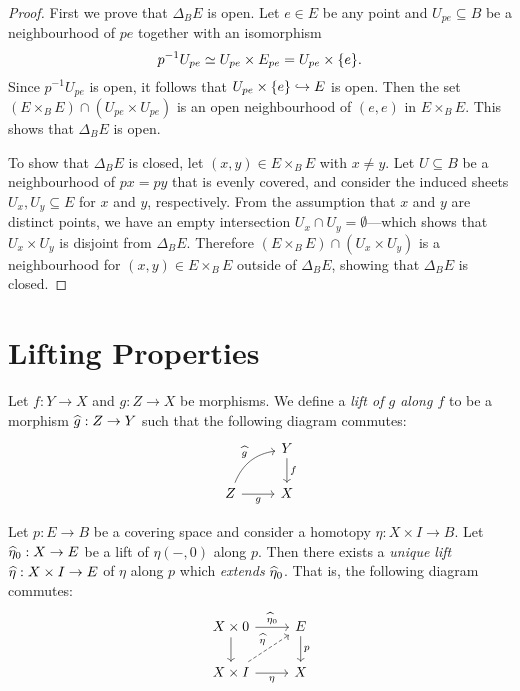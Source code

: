 \begin{proof}
First we prove that \(\Delta_B E\) is open. Let \(e \in E\) be any point and
\(U_{p e} \subseteq B\) be a neighbourhood of \(p e\) together with an
isomorphism
\[
p^{-1} U_{p e} \simeq U_{p e} \times E_{p e} = U_{p e} \times \{e\}.
\]
Since \(p^{-1} U_{p e}\) is open, it follows that
\(U_{p e} \times \{e\} \hookrightarrow E\) is open. Then the set
\((E \times_B E) \cap (U_{p e} \times U_{p e})\) is an open neighbourhood of
\((e, e)\) in \(E \times_B E\). This shows that \(\Delta_B E\) is open.

To show that \(\Delta_B E\) is closed, let \((x, y) \in E \times_B E\) with
\(x \neq y\). Let \(U \subseteq B\) be a neighbourhood of \(p x = p y\) that is
evenly covered, and consider the induced sheets \(U_x, U_y \subseteq E\) for
\(x\) and \(y\), respectively. From the assumption that \(x\) and \(y\) are
distinct points, we have an empty intersection
\(U_x \cap U_y = \emptyset\)---which shows that \(U_x \times U_y\) is disjoint
from \(\Delta_B E\). Therefore \((E \times_B E) \cap (U_x \times U_y)\) is a
neighbourhood for \((x, y) \in E \times_B E\) outside of \(\Delta_B E\), showing
that \(\Delta_B E\) is closed.
\end{proof}

\section{Lifting Properties}

\begin{definition}[Lift]
\label{def:lift-top}
Let \(f: Y \to X\) and \(g: Z \to X\) be morphisms. We define a \emph{lift of
  \(g\) along \(f\)} to be a morphism \(\widehat{g}: Z \to Y\) such that the
following diagram commutes:
\[
\begin{tikzcd}
 &Y \ar[d, "f"] \\
Z \ar[r, "g"'] \ar[ru, "\lift g", bend left] & X
\end{tikzcd}
\]
\end{definition}

\begin{proposition}
\label{prop:homotopy-lift-via-covering-space}
Let \(p: E \to B\) be a covering space and consider a homotopy \(\eta: X \times
I \to B\). Let \(\widehat \eta_0: X \to E\) be a lift of \(\eta(-, 0)\) along
\(p\). Then there exists a \emph{unique lift} \(\widehat \eta: X \times I \to E\)
of \(\eta\) along \(p\) which \emph{extends} \(\widehat \eta_0\). That is, the
following diagram commutes:
\[
\begin{tikzcd}
X \times 0 \ar[r, "\lift \eta_0"] \ar[d]
&E \ar[d, "p"] \\
X \times I \ar[ru, dashed, "\lift \eta"] \ar[r, "\eta"']
&X
\end{tikzcd}
\]
\end{proposition}

